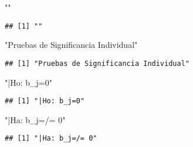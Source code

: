\documentclass[
]{article}
\newenvironment{Shaded}{\begin{snugshade}}{\end{snugshade}}
\newcommand{\StringTok}[1]{\textcolor[rgb]{0.31,0.60,0.02}{#1}}
\begin{document}
\begin{Shaded}
\begin{Highlighting}[]
\StringTok{""}
\end{Highlighting}
\end{Shaded}

\begin{verbatim}
## [1] ""
\end{verbatim}

\begin{Shaded}
\begin{Highlighting}[]
\StringTok{"Pruebas de Significancia Individual"}
\end{Highlighting}
\end{Shaded}

\begin{verbatim}
## [1] "Pruebas de Significancia Individual"
\end{verbatim}

\begin{Shaded}
\begin{Highlighting}[]
\StringTok{"|Ho: b_j=0"}  
\end{Highlighting}
\end{Shaded}

\begin{verbatim}
## [1] "|Ho: b_j=0"
\end{verbatim}

\begin{Shaded}
\begin{Highlighting}[]
\StringTok{"|Ha: b_j=/= 0"}
\end{Highlighting}
\end{Shaded}

\begin{verbatim}
## [1] "|Ha: b_j=/= 0"
\end{verbatim}
\end{document}
